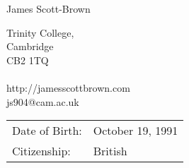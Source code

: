 \documentclass[letterpaper]{article}
\def\name{James Scott-Brown}
\begin{document}
{\huge \name}


\vspace{0.25in}
\begin{minipage}[t]{0.5\textwidth}
Trinity College,\\
Cambridge\\
CB2 1TQ\\ \\
http://jamesscottbrown.com\\
js904@cam.ac.uk \\
\end{minipage}
\begin{minipage}[t]{0.5\textwidth}
\begin{tabular}{ll}  	
Date of Birth: &October 19, 1991 \\
Citizenship: &British
\end{tabular}
\end{minipage}
\end{document}
